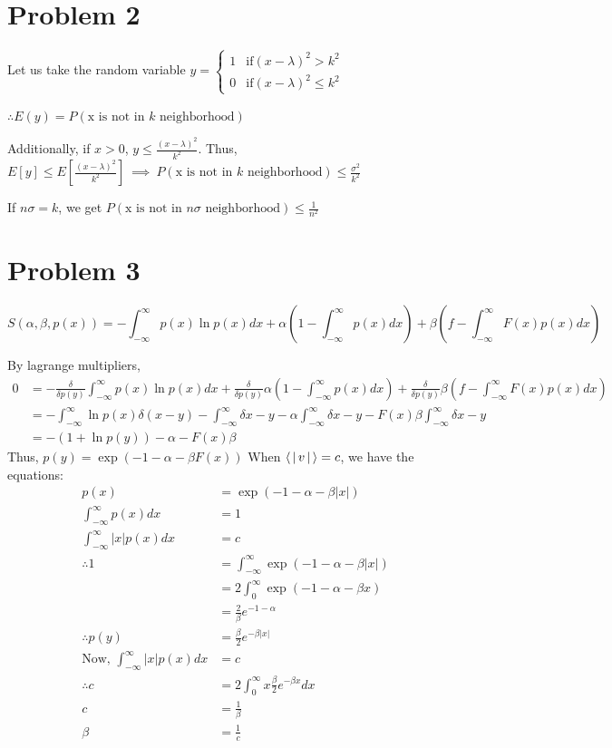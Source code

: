 \documentclass[12pt]{article}
\begin{document}
\section*{Problem 2}

Let us take the random variable $y = \left\lbrace\begin{array}{ll}1 & \text{if} (x-\lambda)^2 > k^2\\
0 & \text{if} (x-\lambda)^2 \leq k^2\end{array}\right.$

$\therefore E(y) = P(\text{x is not in $k$ neighborhood})$

Additionally, if $x >0$, $y \leq \frac{(x-\lambda)^2}{k^2}$. Thus, $E[y] \leq E[\frac{(x-\lambda)^2}{k^2}] ~\implies~ P(\text{x is not in } k \text{ neighborhood}) \leq \frac{\sigma^2}{k^2}$

If $n\sigma = k$, we get $\boxed{P(\text{x is not in } n\sigma \text{ neighborhood}) \leq \frac1{n^2}}$

\section*{Problem 3}
\newcommand{\inint}{\int_{-\infty}^\infty}
$$S(\alpha, \beta, p(x)) = -\inint p(x)\ln p(x)dx + \alpha\left(1-\inint p(x)dx\right)+ \beta\left(f-\inint F(x)p(x)dx\right)$$

By lagrange multipliers, \begin{align*}
0 &= -\frac{\delta}{\delta p(y)}\inint p(x)\ln p(x)dx + \frac{\delta}{\delta p(y)} \alpha\left(1-\inint p(x)dx\right)+\frac{\delta}{\delta p(y)}\beta\left(f-\inint F(x)p(x)dx\right)\\
&= -\inint \ln p(x)\delta(x-y) - \inint \delta{x-y} - \alpha\inint \delta{x-y} -F(x)\beta\inint \delta{x-y} \\
&= -(1+\ln p(y)) - \alpha - F(x)\beta
\end{align*} 
Thus, $p(y) = \exp(-1-\alpha - \beta F(x))$
When $\Braket{|v|} = c$, we have the equations:
\begin{align*}
p(x) &= \exp(-1-\alpha - \beta |x|)\\
\inint p(x) dx &= 1\\
\inint |x| p(x) dx &= c\\
\therefore 1 &= \inint \exp(-1-\alpha - \beta |x|) \\
 &= 2\int_0^\infty \exp(-1-\alpha - \beta x)\\
 &= \frac{2}{\beta}e^{-1-\alpha}\\
 \therefore p(y) &= \frac{\beta}{2} e^{-\beta|x|}\\
 \text {Now, } \inint |x| p(x) dx &= c\\
 \therefore c &= 2\int_0^\infty x\frac{\beta}{2} e^{-\beta x}dx \\
 c &= \frac{1}{\beta}\\
 \beta &= \frac1 c
\end{align*}
\end{document}
